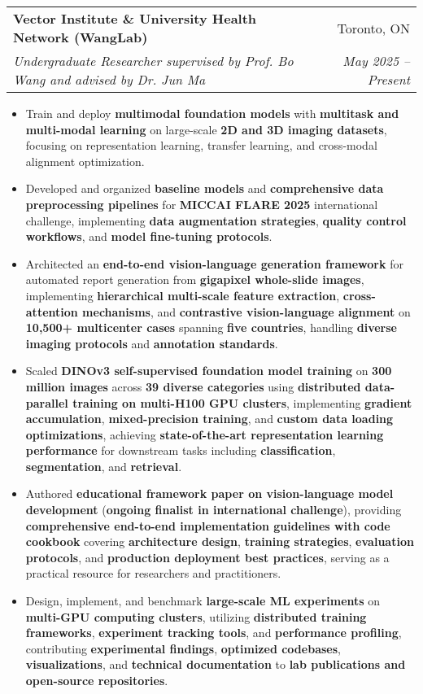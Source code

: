 \documentclass[letterpaper,10pt]{article}
\makeatletter
\newcommand{\resumeItem}[1]{
  \item\small{
    {#1 \vspace{-5pt}}
  }
}
\newcommand{\resumeSubheading}[4]{
  \vspace{-2pt}\item
    \begin{tabular*}{0.97\textwidth}[t]{l@{\extracolsep{\fill}}r}
      \textbf{#1} & #2 \\
      \textit{\small#3} & \textit{\small #4} \\
    \end{tabular*}\vspace{-7pt}
}
\newcommand{\resumeItemListStart}{\begin{itemize}}
\newcommand{\resumeItemListEnd}{\end{itemize}\vspace{-5pt}}
\makeatother
\begin{document}
  \resumeSubheading
  {Vector Institute \& University Health Network (WangLab)}{Toronto, ON}
  {Undergraduate Researcher supervised by Prof. Bo Wang and advised by Dr. Jun Ma}{May 2025 -- Present}
  \resumeItemListStart
    \resumeItem{Train and deploy \textbf{multimodal foundation models} with \textbf{multitask and multi-modal learning} on large-scale \textbf{2D and 3D imaging datasets}, focusing on representation learning, transfer learning, and cross-modal alignment optimization.}
    \resumeItem{Developed and organized \textbf{baseline models} and \textbf{comprehensive data preprocessing pipelines} for \textbf{MICCAI FLARE 2025} international challenge, implementing \textbf{data augmentation strategies}, \textbf{quality control workflows}, and \textbf{model fine-tuning protocols}.}
    \resumeItem{Architected an \textbf{end-to-end vision-language generation framework} for automated report generation from \textbf{gigapixel whole-slide images}, implementing \textbf{hierarchical multi-scale feature extraction}, \textbf{cross-attention mechanisms}, and \textbf{contrastive vision-language alignment} on \textbf{10,500+ multicenter cases} spanning \textbf{five countries}, handling \textbf{diverse imaging protocols} and \textbf{annotation standards}.}
    \resumeItem{Scaled \textbf{DINOv3 self-supervised foundation model training} on \textbf{300 million images} across \textbf{39 diverse categories} using \textbf{distributed data-parallel training on multi-H100 GPU clusters}, implementing \textbf{gradient accumulation}, \textbf{mixed-precision training}, and \textbf{custom data loading optimizations}, achieving \textbf{state-of-the-art representation learning performance} for downstream tasks including \textbf{classification}, \textbf{segmentation}, and \textbf{retrieval}.}
    \resumeItem{Authored \textbf{educational framework paper on vision-language model development} (\textbf{ongoing finalist in international challenge}), providing \textbf{comprehensive end-to-end implementation guidelines with code cookbook} covering \textbf{architecture design}, \textbf{training strategies}, \textbf{evaluation protocols}, and \textbf{production deployment best practices}, serving as a practical resource for researchers and practitioners.}
    \resumeItem{Design, implement, and benchmark \textbf{large-scale ML experiments} on \textbf{multi-GPU computing clusters}, utilizing \textbf{distributed training frameworks}, \textbf{experiment tracking tools}, and \textbf{performance profiling}, contributing \textbf{experimental findings}, \textbf{optimized codebases}, \textbf{visualizations}, and \textbf{technical documentation} to \textbf{lab publications and open-source repositories}.}
  \resumeItemListEnd
\end{document}
